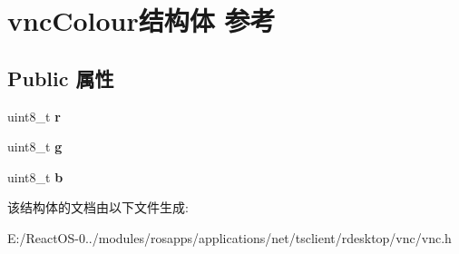 \hypertarget{structvnc_colour}{}\section{vnc\+Colour结构体 参考}
\label{structvnc_colour}
\subsection*{Public 属性}
\begin{DoxyCompactItemize}
\item 
\mbox{\label{structvnc_colour_a28e298cc123833ff9d0e177a57caee72}} 
uint8\+\_\+t {\bfseries r}
\item 
\mbox{\label{structvnc_colour_abb27d61e6cf56d9acec5c1d9db60a02e}} 
uint8\+\_\+t {\bfseries g}
\item 
\mbox{\label{structvnc_colour_a2449520bdcd117683345daf6f5f815d4}} 
uint8\+\_\+t {\bfseries b}
\end{DoxyCompactItemize}


该结构体的文档由以下文件生成\+:\begin{DoxyCompactItemize}
\item 
E\+:/\+React\+O\+S-\/0../modules/rosapps/applications/net/tsclient/rdesktop/vnc/vnc.\+h\end{DoxyCompactItemize}
